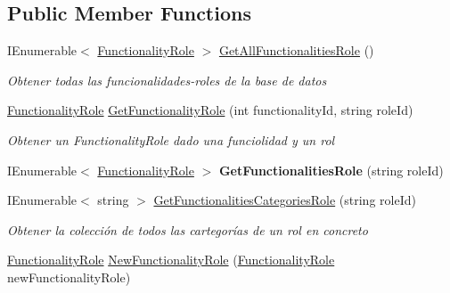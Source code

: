 \subsection*{Public Member Functions}
\begin{DoxyCompactItemize}
\item 
I\+Enumerable$<$ \hyperlink{class_h_k_supply_1_1_models_1_1_functionality_role}{Functionality\+Role} $>$ \hyperlink{class_h_k_supply_1_1_services_1_1_implementations_1_1_e_f_functionality_role_a6c0fd4aad39788ef597f701f47032a85}{Get\+All\+Functionalities\+Role} ()
\begin{DoxyCompactList}\small\item\em Obtener todas las funcionalidades-\/roles de la base de datos \end{DoxyCompactList}\item 
\hyperlink{class_h_k_supply_1_1_models_1_1_functionality_role}{Functionality\+Role} \hyperlink{class_h_k_supply_1_1_services_1_1_implementations_1_1_e_f_functionality_role_a1900a194c92ba75d17fe42830190895f}{Get\+Functionality\+Role} (int functionality\+Id, string role\+Id)
\begin{DoxyCompactList}\small\item\em Obtener un Functionality\+Role dado una funciolidad y un rol \end{DoxyCompactList}\item 
\mbox{\label{class_h_k_supply_1_1_services_1_1_implementations_1_1_e_f_functionality_role_a0cec1ef9a2e1201cfffe604869e5192f}} 
I\+Enumerable$<$ \hyperlink{class_h_k_supply_1_1_models_1_1_functionality_role}{Functionality\+Role} $>$ {\bfseries Get\+Functionalities\+Role} (string role\+Id)
\item 
I\+Enumerable$<$ string $>$ \hyperlink{class_h_k_supply_1_1_services_1_1_implementations_1_1_e_f_functionality_role_a1625ffb6313337132a446f831d357453}{Get\+Functionalities\+Categories\+Role} (string role\+Id)
\begin{DoxyCompactList}\small\item\em Obtener la colección de todos las cartegorías de un rol en concreto \end{DoxyCompactList}\item 
\hyperlink{class_h_k_supply_1_1_models_1_1_functionality_role}{Functionality\+Role} \hyperlink{class_h_k_supply_1_1_services_1_1_implementations_1_1_e_f_functionality_role_a07805a2c9809f3771b7ae34deb15b94b}{New\+Functionality\+Role} (\hyperlink{class_h_k_supply_1_1_models_1_1_functionality_role}{Functionality\+Role} new\+Functionality\+Role)

\end{DoxyCompactItemize}
